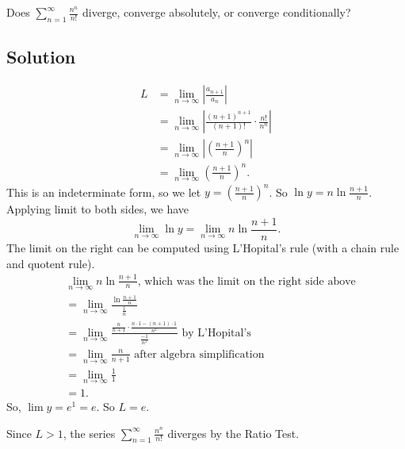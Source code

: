 \documentclass{article}
\begin{document}
\noindent
Does $\displaystyle \sum_{n=1}^\infty \frac{n^n}{n!}$
diverge, converge absolutely, or converge conditionally?

\subsection*{Solution}

\begin{align*}
L&=\lim_{n \to \infty} \left|\frac{a_{n+1}}{a_n}\right|\\
&= \lim_{n \to \infty} \left| \frac{(n+1)^{n+1}}{(n+1)!} \cdot \frac{n!}{n^n}\right|\\
&= \lim_{n \to \infty} \left| \left(\frac{n+1}{n}\right)^n\right|\\
&= \lim_{n \to \infty}  \left(\frac{n+1}{n}\right)^n.
\end{align*}
This is an indeterminate form, so we let $y = \left(\frac{n+1}{n}\right)^n$. So $\ln y = n \ln \frac{n+1}{n}$. Applying limit to both sides, we have
\[ \lim_{n \to \infty} \ln y =  \lim_{n \to \infty}  n \ln \frac{n+1}{n}.\]
The limit on the right can be computed using L'Hopital's rule (with a chain rule and quotent rule).
\begin{align*}
&\lim_{n \to \infty}  n \ln \frac{n+1}{n} \text{, which was the limit on the right side above}\\
&= \lim_{n \to \infty} \frac{ \ln \frac{n+1}{n}}{\frac1n}\\
&= \lim_{n \to \infty} \frac{ \frac{n}{n+1} \cdot \frac{n \cdot 1 - (n+1) \cdot 1}{n^2}}{\frac{-1}{n^2}} \text{ by L'Hopital's}\\
&= \lim_{n \to \infty} \frac{n}{n+1} \text{ after algebra simplification}\\
&= \lim_{n \to \infty} \frac11\\
&= 1.
\end{align*}
So, $\lim y = e^1 = e$. So $L=e$.

Since $L>1$, the series $\displaystyle \sum_{n=1}^\infty \frac{n^n}{n!}$ diverges by the Ratio Test.
\end{document}
